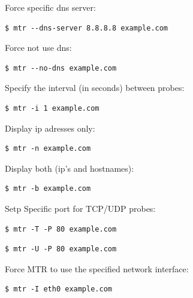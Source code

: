 \documentclass{article}
\newenvironment{codetemplate}[1][]{%
  \mybasecolorbox[#1]
  \itshape
}{%
  \endmybasecolorbox
}
\begin{document}
Force specific dns server:
\begin{codetemplate}
\begin{verbatim}
$ mtr --dns-server 8.8.8.8 example.com
\end{verbatim}
\end{codetemplate}

Force not use dns:
\begin{codetemplate}
\begin{verbatim}
$ mtr --no-dns example.com
\end{verbatim}
\end{codetemplate}

Specify the interval (in seconds) between probes:
\begin{codetemplate}
\begin{verbatim}
$ mtr -i 1 example.com
\end{verbatim}
\end{codetemplate}

Display ip adresses only:
\begin{codetemplate}
\begin{verbatim}
$ mtr -n example.com
\end{verbatim}
\end{codetemplate}

Display both (ip's and hostnames):
\begin{codetemplate}
\begin{verbatim}
$ mtr -b example.com
\end{verbatim}
\end{codetemplate}

Setp Specific port for TCP/UDP probes:
\begin{codetemplate}
\begin{verbatim}
$ mtr -T -P 80 example.com
\end{verbatim}
\end{codetemplate}
\begin{codetemplate}
\begin{verbatim}
$ mtr -U -P 80 example.com
\end{verbatim}
\end{codetemplate}

Force MTR to use the specified network interface:
\begin{codetemplate}
\begin{verbatim}
$ mtr -I eth0 example.com
\end{verbatim}
\end{codetemplate}
\end{document}
